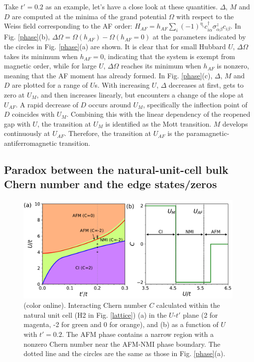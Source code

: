 \documentclass[12pt]{iopart}
\begin{document}
\par Take $t'=0.2$ as an example, let's have a close look at these quantities. $\Delta$, $M$ and $D$ are computed at the minima of the grand potential $\Omega$ with respect to the Weiss field corresponding to the AF order: $H_{AF}=h_{AF}\sum_i(-1)^{\eta_i}c^\dagger_{i\alpha}\sigma^z_{\alpha\beta}c_{i\beta}$. In Fig. \ref{phase}(b), $\Delta\Omega=\Omega(h_{AF})-\Omega(h_{AF}=0)$ at the parameters indicated by the circles in Fig. \ref{phase}(a) are shown. It is clear that for small Hubbard $U$, $\Delta\Omega$ takes its minimum when $h_{AF}=0$, indicating that the system is exempt from magnetic order, while for large $U$, $\Delta\Omega$ reaches its minimum when $h_{AF}$ is nonzero, meaning that the AF moment has already formed. In Fig. \ref{phase}(c), $\Delta$, $M$ and $D$ are plotted for a range of $U$s. With increasing $U$, $\Delta$ decreases at first, gets to zero at $U_M$, and then increases linearly, but encounters a change of the slope at $U_{AF}$. A rapid decrease of $D$ occurs around $U_M$, specifically the inflection point of $D$ coincides with $U_M$. Combining this with the linear dependency of the reopened gap with $U$, the transition at $U_M$ is identified as the Mott transition. $M$ develops continuously at $U_{AF}$. Therefore, the transition at $U_{AF}$ is the paramagnetic-antiferromagnetic transition.

\subsection{Paradox between the natural-unit-cell bulk Chern number and the edge states/zeros}\label{Paradox}

\begin{figure}
\centering
\includegraphics[scale=0.6]{h2chernnumber}
\caption{(color online). Interacting Chern number $C$ calculated within the natural unit cell (H2 in Fig. \ref{lattice}) (a) in the $U$-$t'$ plane (2 for magenta, -2 for green and 0 for orange), and (b) as a function of $U$ with $t'=0.2$. The AFM phase contains a narrow region with a nonzero Chern number near the AFM-NMI phase boundary. The dotted line and the circles are the same as those in Fig. \ref{phase}(a).}\label{h2chernnumber}
\end{figure}
\end{document}
